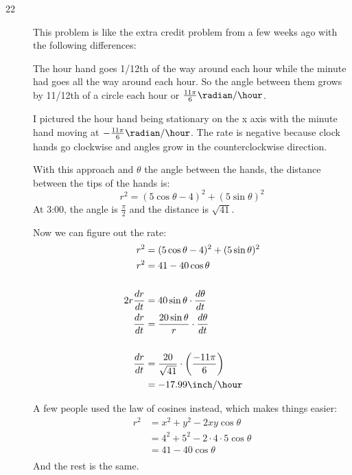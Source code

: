 \documentclass[fleqn]{exam}
\begin{document}
\begin{description}
\item[22]
This problem is like the extra credit problem from a few weeks ago with the following differences:

The hour hand goes 1/12th of the way around each hour while the minute had goes all the way around each hour.  So the
angle between them grows by 11/12th of a circle each hour or $\frac{11 \pi}{6} \radian / \hour$.

I pictured the hour hand being stationary on the x axis with the minute hand moving at $- \frac{11 \pi}{6} \radian /
\hour$.  The rate is negative because clock hands go clockwise and angles grow in the counterclockwise direction.

With this approach and $\theta$ the angle between the hands, the distance between the tips of the hands is:
\[
  r^2 = (5 \cos \theta - 4)^2 + (5 \sin \theta)^2
\]
At 3:00, the angle is $\frac{\pi}{2}$ and the distance is $\sqrt{41}$.

Now we can figure out the rate:
\begin{align*}
  r^2 &= (5 \cos \theta - 4)^2 + (5 \sin \theta)^2 \\
  r^2 &= 41 -40 \cos \theta \\
  \\
  2 r \frac{dr}{dt} &= 40 \sin \theta \cdot \frac{d \theta}{dt} \\
  \frac{dr}{dt} &= \frac{20 \sin \theta}{r} \cdot \frac{d \theta}{dt} \\
  \\
  \frac{dr}{dt} &= \frac{20}{\sqrt{41}} \cdot \left( \frac{-11 \pi}{6} \right) \\
  &= -17.99 \inch / \hour
\end{align*}

A few people used the law of cosines instead, which makes things easier:
\begin{align*}
  r^2 &= x^2 + y^2 - 2xy \cos \theta \\
      &= 4^2 + 5^2 - 2 \cdot 4 \cdot 5 \cos \theta \\
      &= 41 - 40 \cos \theta \\
\end{align*}
And the rest is the same.


\end{description}
\end{document}
